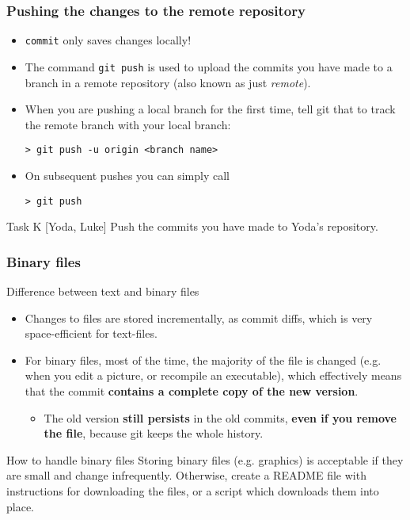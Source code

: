 
\begin{frame}[fragile]
	\frametitle{Pushing the changes to the remote repository}
	
	\begin{itemize}
	\item \texttt{commit} only saves changes \alert{locally}!
	\item The command \texttt{git push} is used to upload the commits you have made to a branch in a remote repository (also known as just \textit{remote}).
	\item When you are pushing a local branch for the first time, tell git that to track the remote branch with your local branch:
	\begin{verbatim}
> git push -u origin <branch name>
	\end{verbatim}
	\item On subsequent pushes you can simply call
	\begin{verbatim}
> git push
	\end{verbatim}
	\end{itemize}

	\begin{block}{Task K [Yoda, Luke]}
	Push the commits you have made to Yoda's repository.
	\end{block}

\end{frame}


\begin{frame}
	\frametitle{Binary files}
	
	\begin{block}{Difference between text and binary files}
	\begin{itemize}
	\item Changes to files are stored incrementally, as commit diffs, which is very space-efficient for text-files.
    \item For binary files, most of the time, the majority of the file is changed (e.g. when you edit a picture, or recompile an executable), which effectively means that the commit \textbf{contains a complete copy of the new version}.
    \begin{itemize}
    \item The old version \textbf{still persists} in the old commits, \textbf{even if you remove the file}, because git keeps the whole history.
    \end{itemize}
    \end{itemize}
	\end{block}
	
	\begin{block}{How to handle binary files}
	Storing binary files (e.g. graphics) is acceptable if they are small and change infrequently. Otherwise, create a README file with instructions for downloading the files, or a script which downloads them into place.
	\end{block}
\end{frame}

